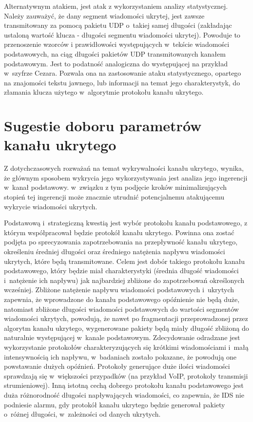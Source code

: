 \documentclass[a4paper, twoside, 12pt]{report}
\begin{document}
       Alternatywnym atakiem, jest atak z wykorzystaniem analizy statystycznej.
       Należy zauważyć, że dany segment wiadomości ukrytej, jest zawsze transmitowany
       za pomocą pakietu UDP o~takiej samej długości (zakładając ustaloną wartość klucza -
       długości segmentu wiadomości ukrytej). Powoduje to przenoszenie wzorców i
       prawidłowości występujących w~tekście wiadomości podstawowych, na ciąg długości
       pakietów UDP transmitowanych kanałem podstawowym. Jest to podatność analogiczna
       do występującej na przykład w~szyfrze Cezara. Pozwala ona na zastosowanie
       ataku statystycznego, opartego na znajomości tekstu jawnego, lub informacji
       na temat jego charakterystyk, do złamania klucza użytego w~algorytmie protokołu
       kanału ukrytego.

    \section{Sugestie doboru parametrów kanału ukrytego} \label{SUGESTIEPARAMETROW}
       Z dotychczasowych rozważań na temat wykrywalności kanału ukrytego, wynika,
       że głównym sposobem wykrycia jego wykorzystywania jest analiza jego ingerencji
       w~kanał podstawowy. w~związku z tym podjęcie kroków minimalizujących stopień
       tej ingerencji może znacznie utrudnić potencjalnemu atakującemu wykrycie
       wiadomości ukrytych.

       Podstawową i~strategiczną kwestią jest wybór protokołu kanału podstawowego,
       z którym współpracował będzie protokół kanału ukrytego. Powinna ona zostać
       podjęta po sprecyzowania zapotrzebowania na przepływność kanału ukrytego,
       określeniu średniej długości oraz średniego natężenia napływu wiadomości
       ukrytych, które będą transmitowane. Celem jest dobór takiego protokołu
       kanału podstawowego, który będzie miał charakterystyki (średnia długość wiadomości
       i~natężenie ich napływu) jak najbardziej zbliżone do zapotrzebowań określonych
       wcześniej. Zbliżone natężenie napływu wiadomości podstawowych i~ukrytych zapewnia,
       że wprowadzone do kanału podstawowego opóźnienie nie będą duże, natomiast
       zbliżone długości wiadomości podstawowych do wartości segmentów wiadomości ukrytych,
       powodują, że nawet po fragmentacji przeprowadzonej przez algorytm kanału ukrytego,
       wygenerowane pakiety będą miały długość zbliżoną do naturalnie występującej
       w~kanale podstawowym. Zdecydowanie odradzane jest wykorzystanie protokołów
       charakteryzujących się krótkimi wiadomościami i~małą intensywnością ich napływu,
       w~badaniach zostało pokazane, że powodują one powstawanie dużych opóźnień.
       Protokoły generujące duże ilości wiadomości sprawdzają się w~większości
       przypadków (na przykład VoIP, protokoły transmisji strumieniowej).
       Inną istotną cechą dobrego protokołu kanału podstawowego jest duża różnorodność
       długości napływających wiadomości, co zapewnia, że IDS nie podniesie alarmu,
       gdy protokół kanału ukrytego będzie generował pakiety o~różnej długości,
       w~zależności od danych ukrytych.
\end{document}
